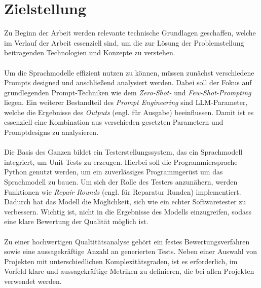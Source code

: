 \section{Zielstellung} 
Zu Beginn der Arbeit werden relevante technische Grundlagen geschaffen, welche im Verlauf der Arbeit essenziell sind, um die zur Lösung der Problemstellung beitragenden Technologien und Konzepte zu verstehen.\\\\
Um die Sprachmodelle effizient nutzen zu können, müssen zunächst verschiedene Prompts designed und anschließend analysiert werden. Dabei soll der Fokus auf grundlegenden Prompt-Techniken wie dem \textit{Zero-Shot-} und \textit{Few-Shot-Prompting} liegen.
Ein weiterer Bestandteil des \textit{Prompt Engineering} sind LLM-Parameter, welche die Ergebnisse des \textit{Outputs} (engl. für Ausgabe) beeinflussen. Damit ist es essenziell eine Kombination aus verschieden gesetzten Parametern und Promptdesigns
zu analysieren.\\\\Die Basis des Ganzen bildet ein Testerstellungssystem, das ein Sprachmodell integriert, um Unit Tests zu erzeugen. Hierbei soll die Programmiersprache Python genutzt werden, um ein zuverlässiges Programmgerüst um das Sprachmodell zu bauen. 
Um sich der Rolle des Testers anzunähern, werden Funktionen wie \textit{Repair Rounds} (engl. für Reparatur Runden) implementiert. Dadurch hat das Modell die Möglichkeit, sich wie ein echter Softwaretester zu verbessern. Wichtig ist, nicht in die Ergebnisse des Modells einzugreifen, sodass eine klare Bewertung der Qualität möglich ist.\\\\
Zu einer hochwertigen Qualtitätsanalyse gehört ein festes Bewertungsverfahren sowie eine aussagekräftige Anzahl an generierten Tests. Neben einer Auswahl von Projekten mit unterschiedlichen Komplexitätsgraden, ist es erforderlich, im Vorfeld klare und aussagekräftige Metriken zu definieren, die bei allen Projekten verwendet werden.    
